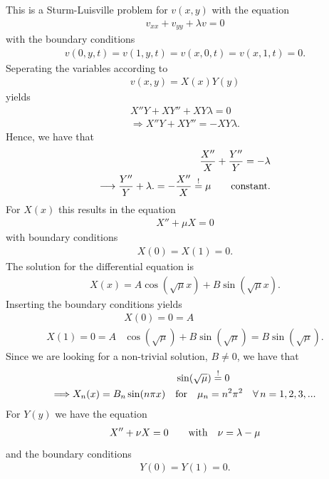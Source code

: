 \documentclass[a4aper,pagesize]{article}
\theoremstyle{definition}
\theoremstyle{plain}
\theoremstyle{remark}
\begin{document}
This is a Sturm-Luisville problem for $v(x, y)$ with the equation
\begin{align}
    v_{xx} + v_{yy} + \lambda v = 0
\end{align}
with the boundary conditions
\begin{align}
    v(0,y,t) = v(1, y, t) = v(x, 0, t) = v(x, 1, t) = 0.
\end{align}
Seperating the variables according to
\begin{align}
    v(x, y) = X(x) Y(y)
\end{align}
yields
\begin{align}
    X''Y + XY''+ XY\lambda = 0\\
    \Longrightarrow  X''Y + XY''=- XY\lambda .
\end{align}
Hence, we have that
\begin{align}
    \frac{X''}{X} + \frac{Y''}{Y} = -\lambda \\
    \longrightarrow \frac{Y''}{Y} + \lambda. = -\frac{X''}{X} \overset{!}{=} \mu \quad \quad{\rm constant}.
\end{align}
For $X(x)$ this results in the equation
\begin{align}
    X'' + \mu X = 0
\end{align}
with boundary conditions
\begin{align}
    X(0) = X(1) = 0.
\end{align}
The solution for the differential equation is
\begin{align}
    X(x) = A \cos(\sqrt{\mu}x) + B\sin(\sqrt{\mu}x).
\end{align}
Inserting the boundary conditions yields
\begin{align}
    &X(0) = 0 = A \\
    X(1) = 0 = A &\cos(\sqrt{\mu}) + B\sin(\sqrt{\mu}) = B\sin(\sqrt{\mu}).
\end{align}
Since we are looking for a non-trivial solution, $B \neq 0$, we have that
\begin{align}
    &\sin(\sqrt{\mu}) \overset{!}{=} 0 \\
    \Longrightarrow X_n(x) = B_n \sin(n\pi  x) \quad& {\rm for} \quad \mu_n = n^2\pi^2 \quad \forall \,n = 1, 2, 3, ...
\end{align}
For $Y(y)$ we have the equation
\begin{align}
    X'' + \nu X = 0 \quad \quad {\rm with} \quad \nu = \lambda - \mu
\end{align}
and the boundary conditions
\begin{align}
    Y(0) = Y(1) = 0.
\end{align}
\end{document}
